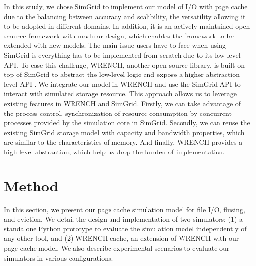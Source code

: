\documentclass[conference]{IEEEtran}
\begin{document}
            In this study, we chose SimGrid to implement our model of I/O with page cache 
            due to the balancing between accuracy and scalibility, the versatility allowing it 
            to be adopted in different domains. 
            In addition, it is an actively maintained open-scource framework with 
            modular design, which enables the framework to be extended with new models. 
            The main issue users have to face when using SimGrid is everything has to be 
            implemented from scratch due to its low-level API. 
            To ease this challenge, WRENCH, another open-source library, is built on top 
            of SimGrid to abstract the low-level logic and expose a higher abstraction 
            level API \cite{casanova2018wrench}. 
            We integrate our model in WRENCH and use the SimGrid API to interact with 
            simulated storage resource.
            This approach allows us to leverage existing features in WRENCH and SimGrid.
            Firstly, we can take advantage of the process control, synchronization of 
            resource consumption by concurrent processes provided by the simulation core 
            in SimGrid. 
            Secondly, we can reuse the existing SimGrid storage model with capacity 
            and bandwidth properties, which are similar to the characteristics of memory.
            And finally, WRENCH provides a high level abstraction, which help us drop 
            the burden of implementation. 
            
    \section{Method}
    \label{method}
    In this section, we present our page cache simulation model for file I/O,
    flusing, and eviction. We detail the design and implementation of two simulators:
    (1) a standalone Python prototype to evaluate the simulation model independently of any other 
    tool, and (2) WRENCH-cache, an extension of WRENCH with our page cache model.
    We also describe experimental scenarios to evaluate our simulators in various configurations.
     
\end{document}

